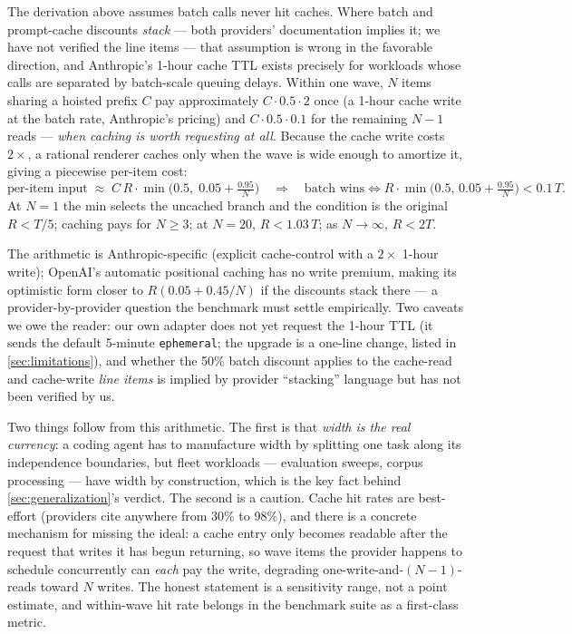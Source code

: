\documentclass[11pt]{article}
\begin{document}
The derivation above assumes batch calls never hit caches. Where batch and prompt-cache discounts \emph{stack} --- both providers' documentation implies it; we have not verified the line items --- that assumption is wrong in the favorable direction, and Anthropic's 1-hour cache TTL exists precisely for workloads whose calls are separated by batch-scale queuing delays. Within one wave, $N$ items sharing a hoisted prefix $C$ pay approximately $C \cdot 0.5 \cdot 2$ once (a 1-hour cache write at the batch rate, Anthropic's pricing) and $C \cdot 0.5 \cdot 0.1$ for the remaining $N{-}1$ reads --- \emph{when caching is worth requesting at all}. Because the cache write costs $2\times$, a rational renderer caches only when the wave is wide enough to amortize it, giving a piecewise per-item cost:
\[
\text{per-item input} \;\approx\; C\,R\cdot\min\!\Big(0.5,\; 0.05 + \tfrac{0.95}{N}\Big)
\quad\Longrightarrow\quad
\text{batch wins} \iff R\cdot\min\!\Big(0.5,\, 0.05+\tfrac{0.95}{N}\Big) < 0.1\,T .
\]
At $N{=}1$ the min selects the uncached branch and the condition is the original $R<T/5$; caching pays for $N \ge 3$; at $N{=}20$, $R < 1.03\,T$; as $N \to \infty$, $R < 2T$.

The arithmetic is Anthropic-specific (explicit cache-control with a $2\times$ 1-hour write); OpenAI's automatic positional caching has no write premium, making its optimistic form closer to $R(0.05+0.45/N)$ if the discounts stack there --- a provider-by-provider question the benchmark must settle empirically. Two caveats we owe the reader: our own adapter does not yet request the 1-hour TTL (it sends the default 5-minute \texttt{ephemeral}; the upgrade is a one-line change, listed in \cref{sec:limitations}), and whether the 50\% batch discount applies to the cache-read and cache-write \emph{line items} is implied by provider ``stacking'' language but has not been verified by us.

Two things follow from this arithmetic. The first is that \emph{width is the real currency}: a coding agent has to manufacture width by splitting one task along its independence boundaries, but fleet workloads --- evaluation sweeps, corpus processing --- have width by construction, which is the key fact behind \cref{sec:generalization}'s verdict. The second is a caution. Cache hit rates are best-effort (providers cite anywhere from 30\% to 98\%), and there is a concrete mechanism for missing the ideal: a cache entry only becomes readable after the request that writes it has begun returning, so wave items the provider happens to schedule concurrently can \emph{each} pay the write, degrading one-write-and-$(N{-}1)$-reads toward $N$ writes. The honest statement is a sensitivity range, not a point estimate, and within-wave hit rate belongs in the benchmark suite as a first-class metric.
\end{document}
